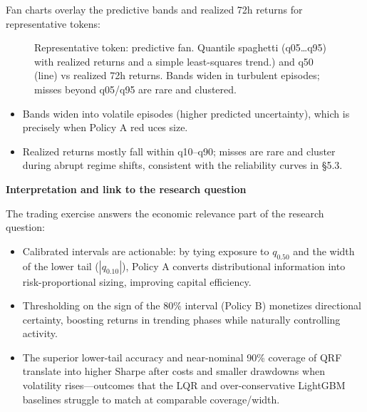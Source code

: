 \documentclass[
  a4paper,
  DIV=11,
  numbers=noendperiod]{scrreprt}
\providecommand{\tightlist}{%
  \setlength{\itemsep}{0pt}\setlength{\parskip}{0pt}}
\begin{document}
Fan charts overlay the predictive bands and realized 72h returns for
representative tokens:

\begin{figure}


\caption{\label{fig-token-fan}Representative token: predictive fan.
Quantile spaghetti (q05\ldots q95) with realized returns and a simple
least-squares trend.) and q50 (line) vs realized 72h returns. Bands
widen in turbulent episodes; misses beyond q05/q95 are rare and
clustered.}

\end{figure}%

\begin{itemize}
\tightlist
\item
  Bands widen into volatile episodes (higher predicted uncertainty),
  which is precisely when Policy A red uces size.
\item
  Realized returns mostly fall within q10--q90; misses are rare and
  cluster during abrupt regime shifts, consistent with the reliability
  curves in §5.3.
\end{itemize}

\textbf{Interpretation and link to the research question}

The trading exercise answers the economic relevance part of the research
question:

\begin{itemize}
\tightlist
\item
  Calibrated intervals are actionable: by tying exposure to \(q_{0.50}\)
  and the width of the lower tail (\(|q_{0.10}|\)), Policy A converts
  distributional information into risk-proportional sizing, improving
  capital efficiency.
\item
  Thresholding on the sign of the 80\% interval (Policy B) monetizes
  directional certainty, boosting returns in trending phases while
  naturally controlling activity.
\item
  The superior lower-tail accuracy and near-nominal 90\% coverage of QRF
  translate into higher Sharpe after costs and smaller drawdowns when
  volatility rises---outcomes that the LQR and over-conservative
  LightGBM baselines struggle to match at comparable coverage/width.
\end{itemize}
\end{document}
